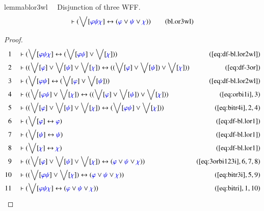 \begin{restatable}{lemma}{blor3wl}~~ Disjunction of three WFF.
\begin{align}
\vdash ( \bigvee[ \mw{\varphi} \mw{\psi} \mw{\chi} ] \leftrightarrow (
    \mw{\varphi} \vee \mw{\psi} \vee \mw{\chi} )
    )\label{eq:bl.or3wl}\tag{bl.or3wl}
\end{align}
\end{restatable}

\begin{proof}
\begin{align}
  1 &&  & \vdash ( \bigvee[ \mw{\varphi} \mw{\psi} \mw{\chi} ] \leftrightarrow
      ( \bigvee[ \mw{\varphi} \mw{\psi} ] \vee \bigvee[
      \mw{\chi} ] ) )&(\mbox{\ref{eq:df-bl.lor2wl}})\notag
  \\ 2 &&  & \vdash ( ( \bigvee[ \mw{\varphi} ] \vee \bigvee[ \mw{\psi} ] \vee
      \bigvee[ \mw{\chi} ] ) \leftrightarrow ( ( \bigvee[
      \mw{\varphi} ] \vee \bigvee[ \mw{\psi} ] ) \vee
      \bigvee[ \mw{\chi} ] )
      )&(\mbox{\ref{eq:df-3or}})\notag
  \\ 3 &&  & \vdash ( \bigvee[ \mw{\varphi} \mw{\psi} ] \leftrightarrow (
      \bigvee[ \mw{\varphi} ] \vee \bigvee[ \mw{\psi} ] )
      )&(\mbox{\ref{eq:df-bl.lor2wl}})\notag
  \\ 4 &&  & \vdash ( ( \bigvee[ \mw{\varphi} \mw{\psi} ] \vee \bigvee[
      \mw{\chi} ] ) \leftrightarrow ( ( \bigvee[
      \mw{\varphi} ] \vee \bigvee[ \mw{\psi} ] ) \vee
      \bigvee[ \mw{\chi} ] )
      )&(\mbox{\ref{eq:orbi1i}},3)\notag
  \\ 5 &&  & \vdash ( ( \bigvee[ \mw{\varphi} ] \vee \bigvee[ \mw{\psi} ] \vee
      \bigvee[ \mw{\chi} ] ) \leftrightarrow ( \bigvee[
      \mw{\varphi} \mw{\psi} ] \vee \bigvee[ \mw{\chi} ] )
      )&(\mbox{\ref{eq:bitr4i}},2,4)\notag
  \\ 6 &&  & \vdash ( \bigvee[ \mw{\varphi} ] \leftrightarrow \mw{\varphi}
      )&(\mbox{\ref{eq:df-bl.lor1}})\notag
  \\ 7 &&  & \vdash ( \bigvee[ \mw{\psi} ] \leftrightarrow \mw{\psi}
      )&(\mbox{\ref{eq:df-bl.lor1}})\notag
  \\ 8 &&  & \vdash ( \bigvee[ \mw{\chi} ] \leftrightarrow \mw{\chi}
      )&(\mbox{\ref{eq:df-bl.lor1}})\notag
  \\ 9 &&  & \vdash ( ( \bigvee[ \mw{\varphi} ] \vee \bigvee[ \mw{\psi} ] \vee
      \bigvee[ \mw{\chi} ] ) \leftrightarrow ( \mw{\varphi}
      \vee \mw{\psi} \vee \mw{\chi} )
      )&(\mbox{\ref{eq:3orbi123i}},6,7,8)\notag
  \\ 10 &&  & \vdash ( ( \bigvee[ \mw{\varphi} \mw{\psi} ] \vee \bigvee[
      \mw{\chi} ] ) \leftrightarrow ( \mw{\varphi} \vee
      \mw{\psi} \vee \mw{\chi} )
      )&(\mbox{\ref{eq:bitr3i}},5,9)\notag
  \\ 11 &&  & \vdash ( \bigvee[ \mw{\varphi} \mw{\psi} \mw{\chi} ]
      \leftrightarrow ( \mw{\varphi} \vee \mw{\psi} \vee
      \mw{\chi} ) )&(\mbox{\ref{eq:bitri}},1,10)\notag
\end{align}
\end{proof}

